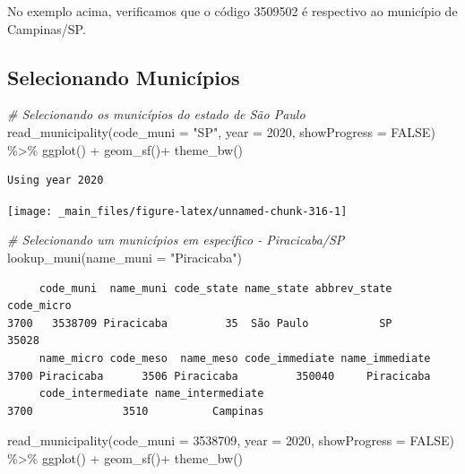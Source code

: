 \documentclass[
  brazilian,
]{book}
\newenvironment{Shaded}{\begin{snugshade}}{\end{snugshade}}
\newcommand{\AttributeTok}[1]{\textcolor[rgb]{0.77,0.63,0.00}{#1}}
\newcommand{\CommentTok}[1]{\textcolor[rgb]{0.56,0.35,0.01}{\textit{#1}}}
\newcommand{\ConstantTok}[1]{\textcolor[rgb]{0.00,0.00,0.00}{#1}}
\newcommand{\DecValTok}[1]{\textcolor[rgb]{0.00,0.00,0.81}{#1}}
\newcommand{\FunctionTok}[1]{\textcolor[rgb]{0.00,0.00,0.00}{#1}}
\newcommand{\NormalTok}[1]{#1}
\newcommand{\SpecialCharTok}[1]{\textcolor[rgb]{0.00,0.00,0.00}{#1}}
\newcommand{\StringTok}[1]{\textcolor[rgb]{0.31,0.60,0.02}{#1}}
\begin{document}
No exemplo acima, verificamos que o código 3509502 é respectivo ao município de Campinas/SP.

\hypertarget{selecionando-municuxedpios}{%
\subsection{Selecionando Municípios}\label{selecionando-municuxedpios}}

\begin{Shaded}
\begin{Highlighting}[]
\CommentTok{\# Selecionando os municípios do estado de São Paulo}
\FunctionTok{read\_municipality}\NormalTok{(}\AttributeTok{code\_muni =} \StringTok{"SP"}\NormalTok{,}
                  \AttributeTok{year =} \DecValTok{2020}\NormalTok{,}
                  \AttributeTok{showProgress =} \ConstantTok{FALSE}\NormalTok{) }\SpecialCharTok{\%\textgreater{}\%} 
  \FunctionTok{ggplot}\NormalTok{() }\SpecialCharTok{+}
  \FunctionTok{geom\_sf}\NormalTok{()}\SpecialCharTok{+}
  \FunctionTok{theme\_bw}\NormalTok{()}
\end{Highlighting}
\end{Shaded}

\begin{verbatim}
Using year 2020
\end{verbatim}

\begin{center}\texttt{[image: \_main\_files/figure-latex/unnamed-chunk-316-1]} \end{center}

\begin{Shaded}
\begin{Highlighting}[]
\CommentTok{\# Selecionando um municípios em específico {-} Piracicaba/SP}
\FunctionTok{lookup\_muni}\NormalTok{(}\AttributeTok{name\_muni =} \StringTok{"Piracicaba"}\NormalTok{)}
\end{Highlighting}
\end{Shaded}

\begin{verbatim}
     code_muni  name_muni code_state name_state abbrev_state code_micro
3700   3538709 Piracicaba         35  São Paulo           SP      35028
     name_micro code_meso  name_meso code_immediate name_immediate
3700 Piracicaba      3506 Piracicaba         350040     Piracicaba
     code_intermediate name_intermediate
3700              3510          Campinas
\end{verbatim}

\begin{Shaded}
\begin{Highlighting}[]
\FunctionTok{read\_municipality}\NormalTok{(}\AttributeTok{code\_muni =} \DecValTok{3538709}\NormalTok{,}
                  \AttributeTok{year =} \DecValTok{2020}\NormalTok{,}
                  \AttributeTok{showProgress =} \ConstantTok{FALSE}\NormalTok{) }\SpecialCharTok{\%\textgreater{}\%}
  \FunctionTok{ggplot}\NormalTok{() }\SpecialCharTok{+}
  \FunctionTok{geom\_sf}\NormalTok{()}\SpecialCharTok{+}
  \FunctionTok{theme\_bw}\NormalTok{()}
\end{Highlighting}
\end{Shaded}
\end{document}
